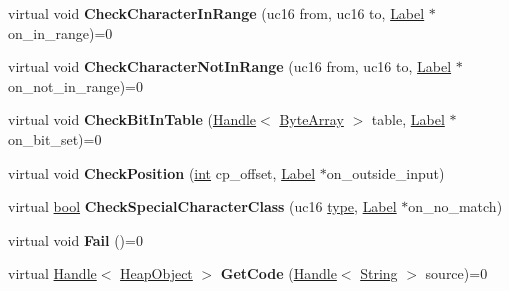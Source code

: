 \begin{DoxyCompactItemize}
virtual void {\bfseries Check\+Character\+In\+Range} (uc16 from, uc16 to, \mbox{\hyperlink{classv8_1_1internal_1_1Label}{Label}} $\ast$on\+\_\+in\+\_\+range)=0
\item 
\mbox{\label{classv8_1_1internal_1_1RegExpMacroAssembler_a63f2f1fe5214dbbd5143dc25d3c25279}} 
virtual void {\bfseries Check\+Character\+Not\+In\+Range} (uc16 from, uc16 to, \mbox{\hyperlink{classv8_1_1internal_1_1Label}{Label}} $\ast$on\+\_\+not\+\_\+in\+\_\+range)=0
\item 
\mbox{\label{classv8_1_1internal_1_1RegExpMacroAssembler_a26238606beb5c4dd46ccf3bd08f400ac}} 
virtual void {\bfseries Check\+Bit\+In\+Table} (\mbox{\hyperlink{classv8_1_1internal_1_1Handle}{Handle}}$<$ \mbox{\hyperlink{classv8_1_1internal_1_1ByteArray}{Byte\+Array}} $>$ table, \mbox{\hyperlink{classv8_1_1internal_1_1Label}{Label}} $\ast$on\+\_\+bit\+\_\+set)=0
\item 
\mbox{\label{classv8_1_1internal_1_1RegExpMacroAssembler_aa506d0e3f87c6934d21ced6a776a729c}} 
virtual void {\bfseries Check\+Position} (\mbox{\hyperlink{classint}{int}} cp\+\_\+offset, \mbox{\hyperlink{classv8_1_1internal_1_1Label}{Label}} $\ast$on\+\_\+outside\+\_\+input)
\item 
\mbox{\label{classv8_1_1internal_1_1RegExpMacroAssembler_a50f9c35c57778c72994841897fda6d6b}} 
virtual \mbox{\hyperlink{classbool}{bool}} {\bfseries Check\+Special\+Character\+Class} (uc16 \mbox{\hyperlink{classstd_1_1conditional_1_1type}{type}}, \mbox{\hyperlink{classv8_1_1internal_1_1Label}{Label}} $\ast$on\+\_\+no\+\_\+match)
\item 
\mbox{\label{classv8_1_1internal_1_1RegExpMacroAssembler_a0a9cebd794b4db9b3561ef1c2193887e}} 
virtual void {\bfseries Fail} ()=0
\item 
\mbox{\label{classv8_1_1internal_1_1RegExpMacroAssembler_abcd2973036a4f070c0fccf2ed45af9ce}} 
virtual \mbox{\hyperlink{classv8_1_1internal_1_1Handle}{Handle}}$<$ \mbox{\hyperlink{classv8_1_1internal_1_1HeapObject}{Heap\+Object}} $>$ {\bfseries Get\+Code} (\mbox{\hyperlink{classv8_1_1internal_1_1Handle}{Handle}}$<$ \mbox{\hyperlink{classv8_1_1internal_1_1String}{String}} $>$ source)=0

\end{DoxyCompactItemize}
